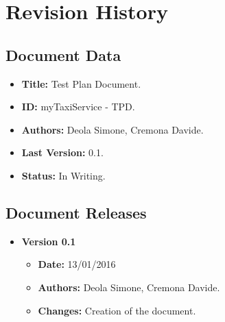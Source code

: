 \documentclass[../../../../testPlan.tex]{subfiles}
\begin{document}
	\section{Revision History}

		\subsection{Document Data}
			\begin{itemize}
				\item \textbf{Title:} Test Plan Document.
				\item \textbf{ID:} myTaxiService - TPD.
				\item \textbf{Authors:} Deola Simone, Cremona Davide.
				\item \textbf{Last Version:} 0.1.
				\item \textbf{Status:} In Writing.
			\end{itemize}

		\subsection{Document Releases}
			\begin{itemize}
				\item \textbf{Version 0.1}
					\begin{itemize}
						\item \textbf{Date:} 13/01/2016
						\item \textbf{Authors:} Deola Simone, Cremona Davide.
						\item \textbf{Changes:} Creation of the document.
					\end{itemize}
			\end{itemize}
\end{document}
